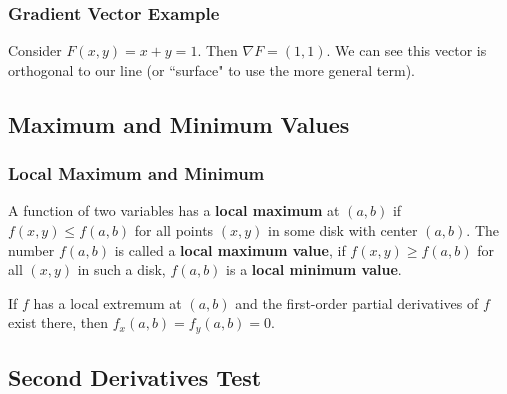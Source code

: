 \documentclass{beamer}
\begin{document}
\begin{frame}
\frametitle{Gradient Vector Example}

Consider $F(x, y) = x + y = 1$. Then $\nabla F = (1, 1)$. We can see this vector is orthogonal to our line (or ``surface" to use the more general term).
\begin{center}
\end{center}
\end{frame}


\subsection{Maximum and Minimum Values}

\begin{frame}
\frametitle{Local Maximum and Minimum}

\begin{Definition}
A function of two variables has a {\bf local maximum} at $(a, b)$ if $f(x, y)\leq f(a, b)$ for all points $(x, y)$ in some disk with center $(a, b)$. The number $f(a, b)$ is called a {\bf local maximum value}, if $f(x, y) \geq f(a, b)$ for all $(x, y)$ in such a disk, $f(a, b)$ is a {\bf local minimum value}.
\end{Definition}

\begin{Theorem}
If $f$ has a local extremum at $(a, b)$ and the first-order partial derivatives of $f$ exist there, then $f_x(a, b) = f_y(a, b) = 0$.
\end{Theorem}

\end{frame}

\subsection{Second Derivatives Test}
\end{document}
